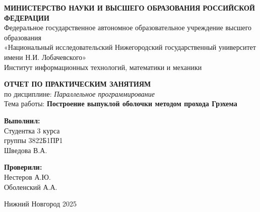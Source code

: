 \documentclass[12pt,a4paper]{extarticle}
\begin{document}
\begin{titlepage}
\begin{center}

\onehalfspacing

\begin{center}
    \textbf{МИНИСТЕРСТВО НАУКИ И ВЫСШЕГО ОБРАЗОВАНИЯ РОССИЙСКОЙ ФЕДЕРАЦИИ} \\
    Федеральное государственное автономное образовательное учреждение высшего образования \\
    «Национальный исследовательский Нижегородский государственный университет имени Н.И. Лобачевского» \\
    Институт информационных технологий, математики и механики
\end{center}

\vspace{3.5cm}

\begin{center}
    \textbf{ОТЧЕТ ПО ПРАКТИЧЕСКИМ ЗАНЯТИЯМ} \vspace{0.5cm}\\
    по дисциплине: \textit{Параллельное программирование} \vspace{0.5cm}\\
    Тема работы: \textbf{Построение выпуклой оболочки методом прохода Грэхема}
\end{center}

\vspace{3.5cm}

\begin{flushright}
    \textbf{Выполнил:} \\
    Студентка 3 курса \\
    группы 3822Б1ПР1 \\
    Шведова В.А. \\

    \vspace{1cm}

    \textbf{Проверили:} \\
    Нестеров А.Ю. \\
    Оболенский А.А.
\end{flushright}

\vfill

\begin{center}
    Нижний Новгород 
    2025
\end{center}

\end{center}
\end{titlepage}
\end{document}
